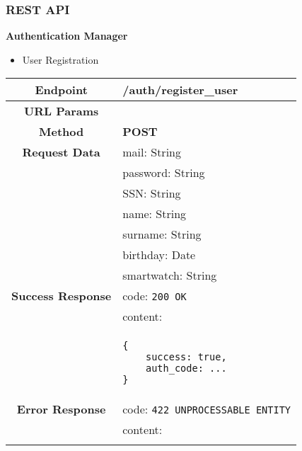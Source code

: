 \subsubsection{REST API}
    \textbf{Authentication Manager}
    \begin{itemize}
        \item User Registration
    \end{itemize}
    \begin{adjustwidth}{1cm}{}
        \begin{longtable}{|c|l|}
            \hline
            \textbf{Endpoint} & /auth/register\_user \\
            \hline
            \textbf{URL Params} &  \\
            \hline
            \textbf{Method} & \textbf{POST} \\
            \hline
            \textbf{Request Data} & mail: String \\
            &                 password: String \\
            &                 SSN: String \\
            &                 name: String \\
            &                 surname: String \\
            &                 birthday: Date \\
            &                 smartwatch: String \\
            \hline
            \textbf{Success Response} & code: \texttt{200 OK} \\
            &                           content: \\
            & \begin{minipage}[t]{0.5\textwidth}
                \begin{adjustwidth}{1.5cm}{}
                \begin{verbatim}
{
    success: true, 
    auth_code: ...
}
                \end{verbatim}
                \end{adjustwidth}
              \end{minipage} \\
              \hline
            \textbf{Error Response} & code: \texttt{422 UNPROCESSABLE ENTITY} \\
            &                         content: \\
            & \begin{minipage}[t]{0.7\textwidth}
                \begin{adjustwidth}{1.5cm}{}

\end{adjustwidth}
\end{minipage}
\end{longtable}
\end{adjustwidth}
